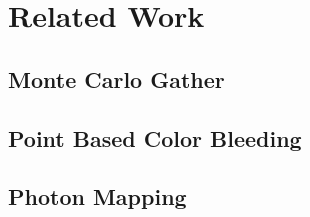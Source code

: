 \chapter{Related Work}

\section{Monte Carlo Gather}

\section{Point Based Color Bleeding}

\section{Photon Mapping}

